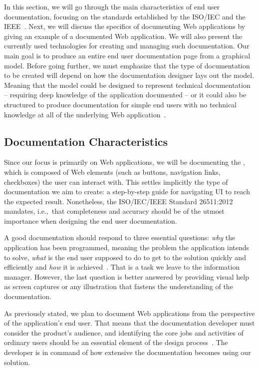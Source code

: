 In this section, we will go through the main characteristics of end user documentation, focusing on the standards established by the ISO/IEC and the IEEE~\cite{ieee5712775, ISO-IEC-IEEE}. Next, we will discuss the specifics of documenting Web applications by giving an example of a documented Web application. We will also present the currently used technologies for creating and managing such documentation. Our main goal is to produce an entire end user documentation page from a graphical model. Before going further, we must emphasize that the type of documentation to be created will depend on how the documentation designer lays out the model. Meaning that the model could be designed to represent technical documentation -- requiring deep knowledge of the application documented -- or it could also be structured to produce documentation for simple end users with no technical knowledge at all of the underlying Web application~\cite{ieee6081814}.


\subsection{Documentation Characteristics}\label{sec:char}

Since our focus is primarily on Web applications, we will be documenting the , which is composed of Web elements (such as buttons, navigation links, checkboxes) the user can interact with. This settles implicitly the type of documentation we aim to create: a step-by-step guide for navigating UI to reach the expected result. Nonetheless, the ISO/IEC/IEEE Standard 26511:2012~\cite{ieee6170926} mandates, i.e.,~that completeness and accuracy should be of the utmost importance when designing the end user documentation.

A good documentation should respond to three essential questions: \textit{why} the application has been programmed, meaning the problem the application intends to solve, \textit{what} is the end user supposed to do to get to the solution quickly and efficiently and \textit{how} it is achieved~\cite{ISO-IEC-IEEE}. That is a task we leave to the information manager. However, the last question is better answered by providing visual help as screen captures or any illustration that fastens the understanding of the documentation. 

As previously stated, we plan to document Web applications from the perspective of the application's end user. That means that the documentation developer must consider the product's audience, and identifying the core jobs and activities of ordinary users should be an essential element of the design process~\cite{ISO-IEC-IEEE}. The developer is in command of how extensive the documentation becomes using our solution.

